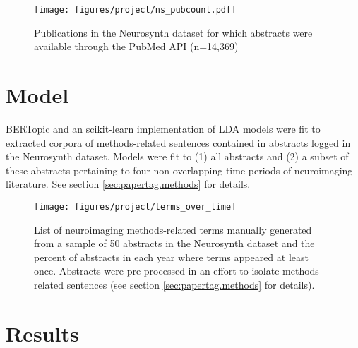 \begin{figure}[!tp]
	\centering
	\texttt{[image: figures/project/ns\_pubcount.pdf]}
	\caption{Publications in the Neurosynth dataset for which abstracts were available through the PubMed API (n=14,369)}
	\label{fig:papertag.pubcounts}
	\end{figure}


\section{Model}
\label{sec:papertag.model}

BERTopic \cite{Grootendorst2022a} and an scikit-learn implementation of LDA \cite{PedregosaEtAl2011} models were fit to extracted corpora of methods-related sentences contained in abstracts logged in the Neurosynth dataset. Models were fit to (1) all abstracts and (2) a subset of these abstracts pertaining to four non-overlapping time periods of neuroimaging literature. See section \ref{sec:papertag.methods} for details.

\begin{figure}[tp!]
	\centering
	\texttt{[image: figures/project/terms\_over\_time]}
	\caption{List of neuroimaging methods-related terms manually generated from a sample of 50 abstracts in the Neurosynth dataset and the percent of abstracts in each year where terms appeared at least once. Abstracts were pre-processed in an effort to isolate methods-related sentences (see section \ref{sec:papertag.methods} for details).}
	\label{fig:papertag.corpus}
\end{figure}

\section{Results}
\label{sec:papertag.results}

